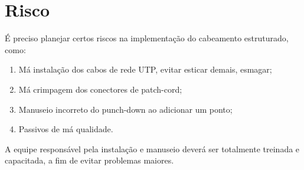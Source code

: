 \documentclass[	DIV=calc,%
							paper=a4,%
							fontsize=12pt,%
							onecolumn]{scrartcl}	 					%
\begin{document}
\section{Risco}
É preciso planejar certos riscos na implementação do cabeamento estruturado, como:
\begin{enumerate}
	\item Má instalação dos cabos de rede UTP, evitar esticar demais, esmagar;
	\item Má crimpagem dos conectores de patch-cord;
	\item Manuseio incorreto do punch-down ao adicionar um ponto;
	\item Passivos de má qualidade.
	
\end{enumerate}
A equipe responsável pela instalação e manuseio deverá ser totalmente treinada e capacitada, a fim de evitar problemas maiores.
\end{document}
